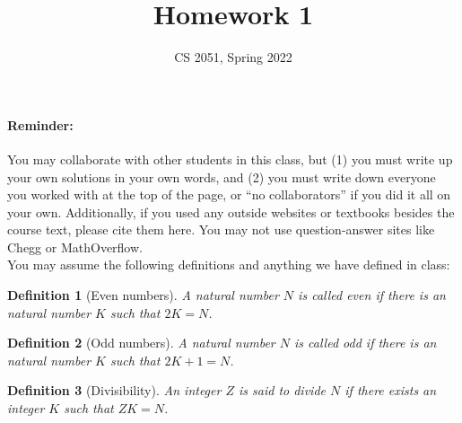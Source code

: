 \documentclass{article}
\newtheorem{definition}{Definition}[section]
\begin{document}
\title{Homework 1}
\author{CS 2051, Spring 2022}
\date{}
\maketitle

\paragraph{Reminder:} You may collaborate with other students in this
class, but (1) you must write up your own solutions in your own words, and (2) 
you must write down everyone you worked with at the top of the page, or ``no 
collaborators'' if you did it all on your own. Additionally, if you used any outside websites or textbooks besides the course text, please cite them here. You may not use question-answer sites like Chegg or MathOverflow. \\

You may assume the following definitions and anything we have defined in class:

\begin{definition}[Even numbers]
A natural number $N$ is called even if there is an natural number $K$ such that $2K = N$.
\end{definition}

\begin{definition}[Odd numbers]
A natural number $N$ is called odd if there is an natural number $K$ such that $2K + 1 = N$.
\end{definition}

\begin{definition}[Divisibility]
An integer $Z$ is said to divide $N$ if there exists an integer $K$ such that $ZK = N$.
\end{definition}

\hrulefill
\end{document}
